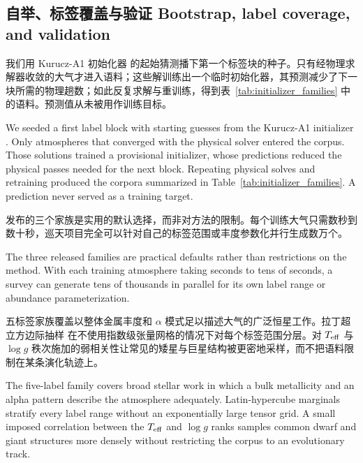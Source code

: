 \subsection{自举、标签覆盖与验证 Bootstrap, label coverage, and validation}\label{sec:atmosphere_emulator_bootstrap}

我们用 Kurucz-A1 初始化器 \citep{Li2025} 的起始猜测播下第一个标签块的种子。只有经物理求解器收敛的大气才进入语料；这些解训练出一个临时初始化器，其预测减少了下一块所需的物理趟数；如此反复求解与重训练，得到表~\ref{tab:initializer_families} 中的语料。预测值从未被用作训练目标。

\begin{EN}
We seeded a first label block with starting guesses from the Kurucz-A1
initializer \citep{Li2025}. Only atmospheres that converged with the physical
solver entered the corpus. Those solutions trained a provisional initializer,
whose predictions reduced the physical passes needed for the next block.
Repeating physical solves and retraining produced the corpora summarized in
Table~\ref{tab:initializer_families}. A prediction never served as a training
target.
\end{EN}

发布的三个家族是实用的默认选择，而非对方法的限制。每个训练大气只需数秒到数十秒，巡天项目完全可以针对自己的标签范围或丰度参数化并行生成数万个。

\begin{EN}
The three released families are practical defaults rather than restrictions on
the method. With each training atmosphere taking seconds to tens of seconds, a
survey can generate tens of thousands in parallel for its own label range or
abundance parameterization.
\end{EN}

五标签家族覆盖以整体金属丰度和 $\alpha$ 模式足以描述大气的广泛恒星工作。拉丁超立方边际抽样 \citep{McKay1979} 在不使用指数级张量网格的情况下对每个标签范围分层。对 $T_{\rm eff}$ 与 $\log g$ 秩次施加的弱相关性让常见的矮星与巨星结构被更密地采样，而不把语料限制在某条演化轨迹上。

\begin{EN}
The five-label family covers broad stellar work in which a bulk metallicity and an
alpha pattern describe the atmosphere adequately. Latin-hypercube
marginals \citep{McKay1979} stratify every label range without an exponentially
large tensor grid. A small imposed correlation between the $T_{\rm eff}$ and
$\log g$ ranks samples common dwarf and giant structures more densely without
restricting the corpus to an evolutionary track.
\end{EN}

